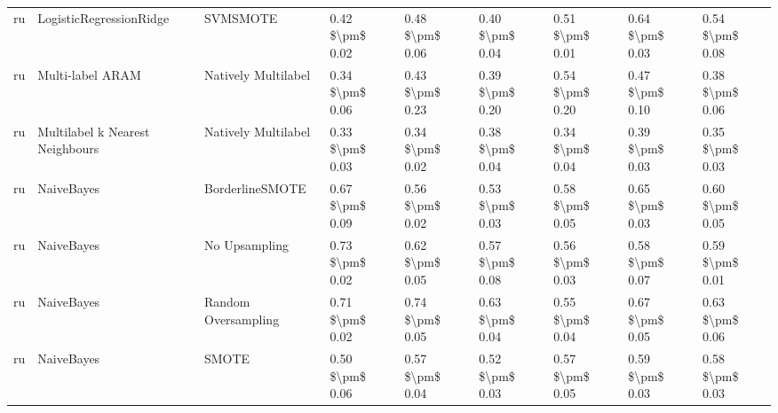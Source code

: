 \begin{tabular}{lllllllll}
      ru &         LogisticRegressionRidge &                      SVMSMOTE &     0.42 \$\textbackslash pm\$ 0.02 &           0.48 \$\textbackslash pm\$ 0.06 &       0.40 \$\textbackslash pm\$ 0.04 &        0.51 \$\textbackslash pm\$ 0.01 &                         0.64 \$\textbackslash pm\$ 0.03 &     0.54 \$\textbackslash pm\$ 0.08 \\
      ru &                Multi-label ARAM &           Natively Multilabel &     0.34 \$\textbackslash pm\$ 0.06 &           0.43 \$\textbackslash pm\$ 0.23 &       0.39 \$\textbackslash pm\$ 0.20 &        0.54 \$\textbackslash pm\$ 0.20 &                         0.47 \$\textbackslash pm\$ 0.10 &     0.38 \$\textbackslash pm\$ 0.06 \\
      ru & Multilabel k Nearest Neighbours &           Natively Multilabel &     0.33 \$\textbackslash pm\$ 0.03 &           0.34 \$\textbackslash pm\$ 0.02 &       0.38 \$\textbackslash pm\$ 0.04 &        0.34 \$\textbackslash pm\$ 0.04 &                         0.39 \$\textbackslash pm\$ 0.03 &     0.35 \$\textbackslash pm\$ 0.03 \\
      ru &                      NaiveBayes &               BorderlineSMOTE &     0.67 \$\textbackslash pm\$ 0.09 &           0.56 \$\textbackslash pm\$ 0.02 &       0.53 \$\textbackslash pm\$ 0.03 &        0.58 \$\textbackslash pm\$ 0.05 &                         0.65 \$\textbackslash pm\$ 0.03 &     0.60 \$\textbackslash pm\$ 0.05 \\
      ru &                      NaiveBayes &                 No Upsampling &     0.73 \$\textbackslash pm\$ 0.02 &           0.62 \$\textbackslash pm\$ 0.05 &       0.57 \$\textbackslash pm\$ 0.08 &        0.56 \$\textbackslash pm\$ 0.03 &                         0.58 \$\textbackslash pm\$ 0.07 &     0.59 \$\textbackslash pm\$ 0.01 \\
      ru &                      NaiveBayes &           Random Oversampling &     0.71 \$\textbackslash pm\$ 0.02 &           0.74 \$\textbackslash pm\$ 0.05 &       0.63 \$\textbackslash pm\$ 0.04 &        0.55 \$\textbackslash pm\$ 0.04 &                         0.67 \$\textbackslash pm\$ 0.05 &     0.63 \$\textbackslash pm\$ 0.06 \\
      ru &                      NaiveBayes &                         SMOTE &     0.50 \$\textbackslash pm\$ 0.06 &           0.57 \$\textbackslash pm\$ 0.04 &       0.52 \$\textbackslash pm\$ 0.03 &        0.57 \$\textbackslash pm\$ 0.05 &                         0.59 \$\textbackslash pm\$ 0.03 &     0.58 \$\textbackslash pm\$ 0.03 \\

\end{tabular}
